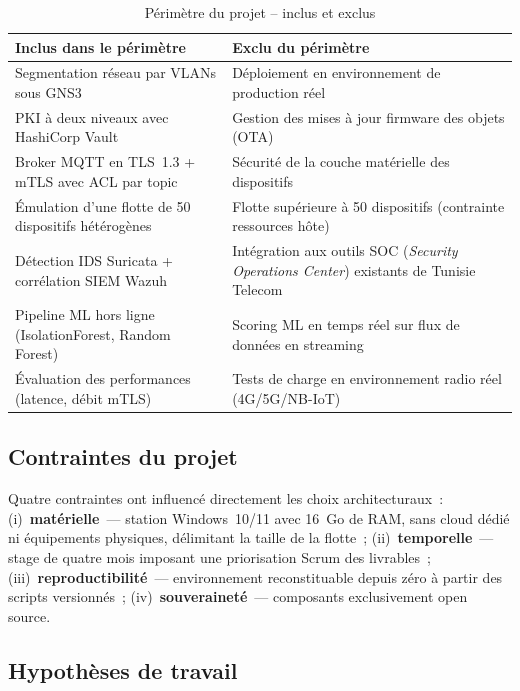 \begin{table}[!htbp]
\centering
\caption{Périmètre du projet -- inclus et exclus}
\label{tab:perimetre}
\small
\begin{tabularx}{\linewidth}{|>{\raggedright\arraybackslash}X|>{\raggedright\arraybackslash}X|}
\hline
\textbf{Inclus dans le périmètre} & \textbf{Exclu du périmètre} \\
\hline
Segmentation réseau par VLANs sous GNS3 & Déploiement en environnement de production réel \\ \hline
PKI à deux niveaux avec HashiCorp Vault & Gestion des mises à jour firmware des objets (OTA) \\ \hline
Broker MQTT en TLS~1.3 + mTLS avec ACL par topic & Sécurité de la couche matérielle des dispositifs \\ \hline
Émulation d'une flotte de 50 dispositifs hétérogènes & Flotte supérieure à 50 dispositifs (contrainte ressources hôte) \\ \hline
Détection IDS Suricata + corrélation SIEM Wazuh & Intégration aux outils SOC (\emph{Security Operations Center}) existants de Tunisie Telecom \\ \hline
Pipeline ML hors ligne (IsolationForest, Random Forest) & Scoring ML en temps réel sur flux de données en streaming \\ \hline
Évaluation des performances (latence, débit mTLS) & Tests de charge en environnement radio réel (4G/5G/NB-IoT) \\ \hline
\end{tabularx}
\end{table}

\subsection{Contraintes du projet}

Quatre contraintes ont influencé directement les choix architecturaux~: (i)~\textbf{matérielle}~--- station Windows~10/11 avec 16~Go de RAM, sans cloud dédié ni équipements physiques, délimitant la taille de la flotte~; (ii)~\textbf{temporelle}~--- stage de quatre mois imposant une priorisation Scrum des livrables~; (iii)~\textbf{reproductibilité}~--- environnement reconstituable depuis zéro à partir des scripts versionnés~; (iv)~\textbf{souveraineté}~--- composants exclusivement open source.

\subsection{Hypothèses de travail}

